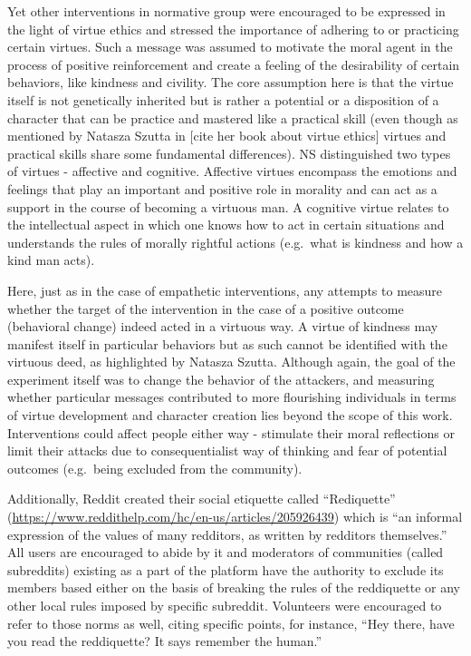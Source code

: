 \documentclass[
  10pt,
  dvipsnames,enabledeprecatedfontcommands]{scrartcl}
\begin{document}
Yet other interventions in normative group were encouraged to be
expressed in the light of virtue ethics and stressed the importance of
adhering to or practicing certain virtues. Such a message was assumed to
motivate the moral agent in the process of positive reinforcement and
create a feeling of the desirability of certain behaviors, like kindness
and civility. The core assumption here is that the virtue itself is not
genetically inherited but is rather a potential or a disposition of a
character that can be practice and mastered like a practical skill (even
though as mentioned by Natasza Szutta in {[}cite her book about virtue
ethics{]} virtues and practical skills share some fundamental
differences). NS distinguished two types of virtues - affective and
cognitive. Affective virtues encompass the emotions and feelings that
play an important and positive role in morality and can act as a support
in the course of becoming a virtuous man. A cognitive virtue relates to
the intellectual aspect in which one knows how to act in certain
situations and understands the rules of morally rightful actions
(e.g.~what is kindness and how a kind man acts).

Here, just as in the case of empathetic interventions, any attempts to
measure whether the target of the intervention in the case of a positive
outcome (behavioral change) indeed acted in a virtuous way. A virtue of
kindness may manifest itself in particular behaviors but as such cannot
be identified with the virtuous deed, as highlighted by Natasza Szutta.
Although again, the goal of the experiment itself was to change the
behavior of the attackers, and measuring whether particular messages
contributed to more flourishing individuals in terms of virtue
development and character creation lies beyond the scope of this work.
Interventions could affect people either way - stimulate their moral
reflections or limit their attacks due to consequentialist way of
thinking and fear of potential outcomes (e.g.~being excluded from the
community).

Additionally, Reddit created their social etiquette called
``Rediquette''
(\url{https://www.reddithelp.com/hc/en-us/articles/205926439}) which is
``an informal expression of the values of many redditors, as written by
redditors themselves.'' All users are encouraged to abide by it and
moderators of communities (called subreddits) existing as a part of the
platform have the authority to exclude its members based either on the
basis of breaking the rules of the reddiquette or any other local rules
imposed by specific subreddit. Volunteers were encouraged to refer to
those norms as well, citing specific points, for instance, ``Hey there,
have you read the reddiquette? It says remember the human.''
\end{document}
